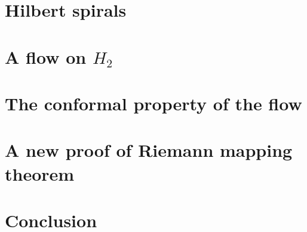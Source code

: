 \documentclass{article}
\begin{document}
\section{Hilbert spirals}\label{sec:space-filling}

\section{A flow on $H_2$}\label{sec:flow}

\section{The conformal property of the flow}\label{sec:conformal}

\section{A new proof of Riemann mapping theorem}\label{sec:riemann-mapping}

\section{Conclusion}\label{sec:conclusion}
\end{document}
